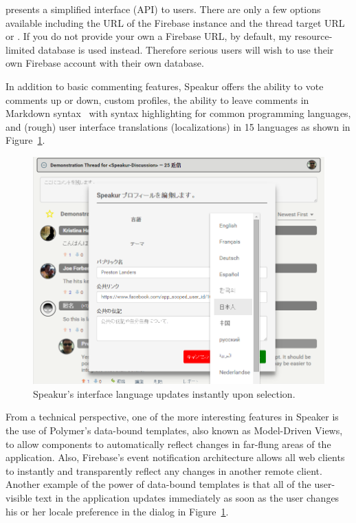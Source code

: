  presents a simplified interface (API) to users.
There are only a few options available including the URL of the Firebase instance and the thread target URL or .
If you do not provide your own a Firebase URL, by default, my resource-limited database is used instead.
Therefore serious users will wish to use their own Firebase account with their own database.

In addition to basic commenting features, Speakur offers the ability to vote comments up or down, custom profiles, 
the ability to leave comments in Markdown syntax~\cite{githubcontributors2015} with syntax highlighting for common programming languages, 
and (rough) user interface translations 
(localizations) 
in 15 languages as shown in Figure~\ref{f:lang}.

\begin{figure}[htb]
\centering
 \includegraphics[width=\textwidth]{images/screenshot_20150320_1923_lang.png}
\caption{Speakur's interface language updates instantly upon selection.}
\label{f:lang}
\end{figure}

From a technical perspective, one of the more interesting features in Speaker is the use of Polymer's data-bound templates, also known as Model-Driven Views, 
to allow components to automatically reflect changes in far-flung areas of the application.
Also, Firebase's event notification architecture allows all web clients to instantly and transparently reflect any changes in another remote client.
Another example of the power of data-bound templates is that all of the user-visible text in the application updates immediately as soon as the user changes his or her locale preference in the dialog in Figure~\ref{f:lang}.

